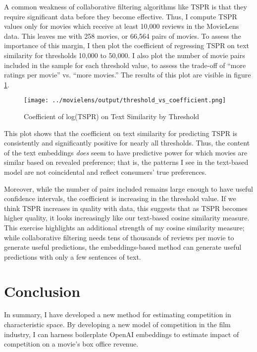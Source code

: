 \documentclass{article}
\begin{document}
A common weakness of collaborative filtering algorithms like TSPR is that they require significant data before they become effective. Thus, I compute TSPR values only for movies which receive at least 10,000 reviews in the MovieLens data. This leaves me with 258 movies, or 66,564 pairs of movies. To assess the importance of this margin, I then plot the coefficient of regressing TSPR on text similarity for thresholds 10,000 to 50,000. I also plot the number of movie pairs included in the sample for each threshold value, to assess the trade-off of ``more ratings per movie'' vs. ``more movies.'' The results of this plot are visible in figure \ref{fig:tspr_threshold}. 

\begin{figure}
    \begin{center}
    \texttt{[image: ../movielens/output/threshold\_vs\_coefficient.png]}
    \caption{Coefficient of log(TSPR) on Text Similarity by Threshold}
    \label{fig:tspr_threshold}
    \end{center}
\end{figure}

This plot shows that the coefficient on text similarity for predicting TSPR is consistently and significantly positive for nearly all thresholds. Thus, the content of the text embeddings \emph{does} seem to have predictive power for which movies are similar based on revealed preference; that is, the patterns I see in the text-based model are not coincidental and reflect consumers' true preferences. 

Moreover, while the number of pairs included remains large enough to have useful confidence intervals, the coefficient is increasing in the threshold value. If we think TSPR increases in quality with data, this suggests that as TSPR becomes higher quality, it looks increasingly like our text-based cosine similarity measure. This exercise highlights an additional strength of my cosine similarity measure; while collaborative filtering needs tens of thousands of reviews per movie to generate useful predictions, the embeddings-based method can generate useful predictions with only a few sentences of text.


\section{Conclusion}

In summary, I have developed a new method for estimating competition in characteristic space. By developing a new model of competition in the film industry, I can harness boilerplate OpenAI embeddings to estimate impact of competition on a movie's box office revenue. 
\end{document}
